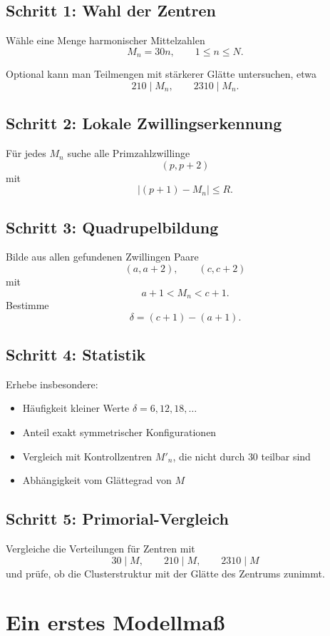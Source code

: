 \documentclass[11pt,a4paper]{article}
\theoremstyle{definition}
\theoremstyle{plain}
\theoremstyle{remark}
\newcommand{\abs}[1]{\left|#1\right|}
\begin{document}
	\subsection*{Schritt 1: Wahl der Zentren}
	Wähle eine Menge harmonischer Mittelzahlen
	\[
	M_n = 30n,\qquad 1\le n\le N.
	\]
	
	Optional kann man Teilmengen mit stärkerer Glätte untersuchen, etwa
	\[
	210\mid M_n,\qquad 2310\mid M_n.
	\]
	
	\subsection*{Schritt 2: Lokale Zwillingserkennung}
	Für jedes $M_n$ suche alle Primzahlzwillinge
	\[
	(p,p+2)
	\]
	mit
	\[
	\abs{(p+1)-M_n}\le R.
	\]
	
	\subsection*{Schritt 3: Quadrupelbildung}
	Bilde aus allen gefundenen Zwillingen Paare
	\[
	(a,a+2),\qquad (c,c+2)
	\]
	mit
	\[
	a+1 < M_n < c+1.
	\]
	Bestimme
	\[
	\delta=(c+1)-(a+1).
	\]
	
	\subsection*{Schritt 4: Statistik}
	Erhebe insbesondere:
	
	\begin{itemize}[leftmargin=1.5em]
		\item Häufigkeit kleiner Werte $\delta=6,12,18,\dots$
		\item Anteil exakt symmetrischer Konfigurationen
		\item Vergleich mit Kontrollzentren $M'_n$, die nicht durch $30$ teilbar sind
		\item Abhängigkeit vom Glättegrad von $M$
	\end{itemize}
	
	\subsection*{Schritt 5: Primorial-Vergleich}
	Vergleiche die Verteilungen für Zentren mit
	\[
	30\mid M,\qquad 210\mid M,\qquad 2310\mid M
	\]
	und prüfe, ob die Clusterstruktur mit der Glätte des Zentrums zunimmt.
	
	\section{Ein erstes Modellmaß}
	
\end{document}
